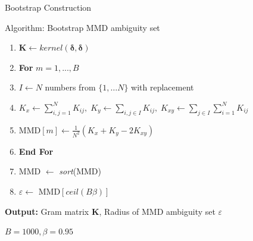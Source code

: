 \documentclass[student, noshadow, itr, english, aspectratio=169]{ITR_LSR_slides}
\begin{document}
\begin{frame}{Bootstrap Construction}
\begin{block}{Algorithm: Bootstrap MMD ambiguity set}
\begin{enumerate}
\item $\boldsymbol{K} \leftarrow \textit{kernel}(\boldsymbol{\delta}, \boldsymbol{\delta})$
\item \textbf{For} $m = 1,...,B$
\item \;\; $I \leftarrow N$ numbers from $\{1, \dots N \}$ with replacement
\item \;\; $K_x \leftarrow \sum_{i,j = 1}^N K_{ij}, \;K_y \leftarrow \sum_{i,j \in I} K_{ij}, \;K_{xy} \leftarrow \sum_{j \in I} \sum_{i = 1}^N K_{ij}$
\item \;\; MMD$[m] \leftarrow \frac{1}{N^2} \left( K_x + K_y - 2 K_{xy} \right) $
\item \textbf{End For} 
\item MMD $ \leftarrow$ \textit{sort}(MMD)
\item $\varepsilon \gets$ MMD$\left[ \textit{ceil} (B \beta) \right]$
\end{enumerate}
\textbf{Output:} Gram matrix $\boldsymbol{K}$, Radius of MMD ambiguity set $\varepsilon$
\end{block}
$B = 1000, \beta = 0.95$
\end{frame}
\end{document}
